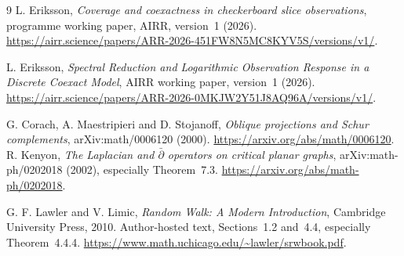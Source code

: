 \documentclass[11pt]{article}
\theoremstyle{definition}
\theoremstyle{remark}
\begin{document}
\begin{thebibliography}{9}
L. Eriksson, \emph{Coverage and coexactness in checkerboard slice observations},
programme working paper, AIRR, version~1 (2026).
\url{https://airr.science/papers/ARR-2026-451FW8N5MC8KYV5S/versions/v1/}.

L. Eriksson, \emph{Spectral Reduction and Logarithmic Observation Response
in a Discrete Coexact Model}, AIRR working paper, version~1 (2026).
\url{https://airr.science/papers/ARR-2026-0MKJW2Y51J8AQ96A/versions/v1/}.

G. Corach, A. Maestripieri and D. Stojanoff,
\emph{Oblique projections and Schur complements}, arXiv:math/0006120 (2000).
\url{https://arxiv.org/abs/math/0006120}.
R. Kenyon, \emph{The Laplacian and $\bar\partial$ operators on critical planar
graphs}, arXiv:math-ph/0202018 (2002), especially Theorem~7.3.
\url{https://arxiv.org/abs/math-ph/0202018}.

G. F. Lawler and V. Limic, \emph{Random Walk: A Modern Introduction},
Cambridge University Press, 2010. Author-hosted text, Sections~1.2 and~4.4,
especially Theorem~4.4.4.
\url{https://www.math.uchicago.edu/~lawler/srwbook.pdf}.
\end{thebibliography}
\end{document}
